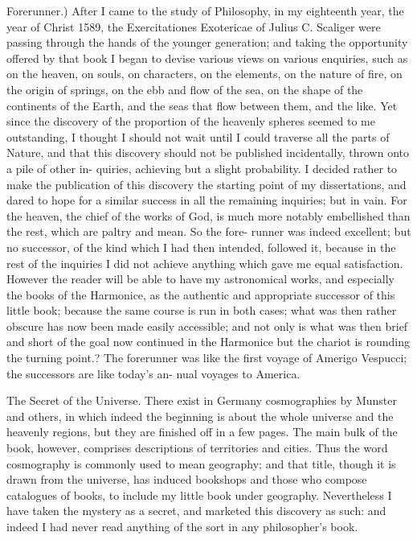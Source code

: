 \documentclass{article}
\begin{document}
{{{{{Forerunner.) After I came to the study of Philosophy, in my eighteenth year, the year of
Christ 1589, the Exercitationes Exotericae of Julius C. Scaliger were passing through the
hands of the younger generation; and taking the opportunity offered by that book I began
to devise various views on various enquiries, such as on the heaven, on souls, on characters,
on the elements, on the nature of fire, on the origin of springs, on the ebb and flow of the
sea, on the shape of the continents of the Earth, and the seas that flow between them, and
the like. Yet since the discovery of the proportion of the heavenly spheres seemed to me
outstanding, I thought I should not wait until I could traverse all the parts of Nature, and
that this discovery should not be published incidentally, thrown onto a pile of other in-
quiries, achieving but a slight probability. I decided rather to make the publication of this
discovery the starting point of my dissertations, and dared to hope for a similar success in
all the remaining inquiries; but in vain. For the heaven, the chief of the works of God, is
much more notably embellished than the rest, which are paltry and mean. So the fore-
runner was indeed excellent; but no successor, of the kind which I had then intended,
followed it, because in the rest of the inquiries I did not achieve anything which gave me
equal satisfaction. However the reader will be able to have my astronomical works, and
especially the books of the Harmonice, as the authentic and appropriate successor of this
little book; because the same course is run in both cases; what was then rather obscure has
now been made easily accessible; and not only is what was then brief and short of the goal
now continued in the Harmonice but the chariot is rounding the turning point.? The
forerunner was like the first voyage of Amerigo Vespucci; the successors are like today’s an-
nual voyages to America.

The Secret of the Universe. There exist in Germany cosmographies by Munster and
others, in which indeed the beginning is about the whole universe and the heavenly regions,
but they are finished off in a few pages. The main bulk of the book, however, comprises
descriptions of territories and cities. Thus the word cosmography is commonly used to
mean geography; and that title, though it is drawn from the universe, has induced
bookshops and those who compose catalogues of books, to include my little book under
geography. Nevertheless I have taken the mystery as a secret, and marketed this discovery
as such: and indeed I had never read anything of the sort in any philosopher's book.

}}}}}
\end{document}
